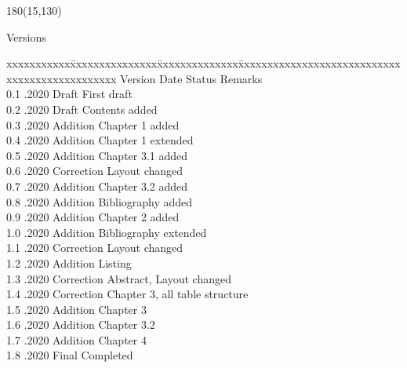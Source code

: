 
\begin{textblock}{180}(15,130)
\color{black}
\begin{huge}
Versions
\end{huge}
\vspace{5mm}

\fontsize{10pt}{18pt}\selectfont
\begin{tabbing}
xxxxxxxxxxx\=xxxxxxxxxxxxxxx\=xxxxxxxxxxxxxx\=xxxxxxxxxxxxxxxxxxxxxxxxxxxxxxxxxxxxxxxxxxxxxxx \kill
Version	\> Date	\> Status			\> Remarks		\\
0.1 .2020 \> Draft      \> First draft           \\
0.2 .2020 \> Draft      \> Contents added        \\
0.3 .2020 \> Addition   \> Chapter 1 added       \\
0.4 .2020 \> Addition   \> Chapter 1 extended    \\
0.5 .2020 \> Addition   \> Chapter 3.1 added     \\
0.6 .2020 \> Correction \> Layout changed        \\
0.7 .2020 \> Addition   \> Chapter 3.2 added     \\
0.8 .2020 \> Addition   \> Bibliography added    \\
0.9 .2020 \> Addition   \> Chapter 2 added       \\
1.0 .2020 \> Addition   \> Bibliography extended \\
1.1 .2020 \> Correction \> Layout changed        \\
1.2 .2020 \> Addition   \> Listing               \\
1.3 .2020 \> Correction \> Abstract, Layout changed        \\
1.4 .2020 \> Correction	\> Chapter 3, all table structure	 \\
1.5 .2020 \> Addition	\> Chapter 3			 \\
1.6 .2020 \> Addition	\> Chapter 3.2 			 \\
1.7 .2020 \> Addition	\> Chapter 4			 \\
1.8 .2020 \> Final      \> Completed             \\
\end{tabbing}

\end{textblock}



